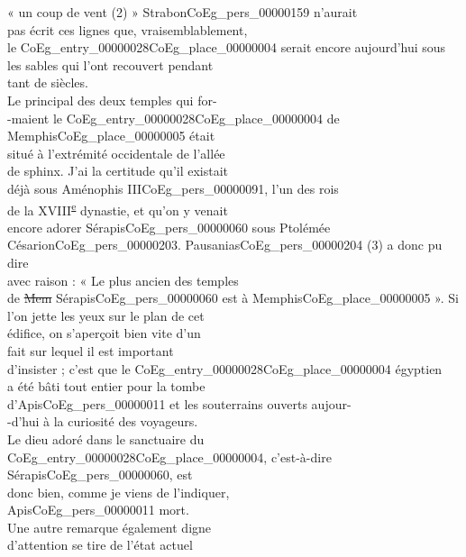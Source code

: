 \documentclass{book}
\begin{document}
{\begin{paracol}{2}
« un coup de vent (2) » Strabon\gls{CoEg_pers_00000159} n’aurait\\
pas écrit ces lignes que, vraisemblablement,\\
le \Gls{CoEg_entry_00000028}\gls{CoEg_place_00000004} serait encore aujourd’hui sous\\
les sables qui l’ont recouvert pendant\\
tant de siècles.\\
\indent Le principal des deux temples qui for-\\
-maient le \Gls{CoEg_entry_00000028}\gls{CoEg_place_00000004} de Memphis\gls{CoEg_place_00000005} était\\
situé à l’extrémité occidentale de l’allée\\
de sphinx. J’ai la certitude qu’il existait\\
déjà sous Aménophis III\gls{CoEg_pers_00000091}, l’un des rois\\
de la XVIII\textsuperscript{\underline{e}} dynastie, et qu’on y venait\\
encore adorer Sérapis\gls{CoEg_pers_00000060} sous Ptolémée\\
Césarion\gls{CoEg_pers_00000203}. Pausanias\gls{CoEg_pers_00000204} (3) a donc pu dire\\
avec raison : « Le plus ancien des temples\\
de \sout{Mem} Sérapis\gls{CoEg_pers_00000060} est à Memphis\gls{CoEg_place_00000005} ». Si\\
l’on jette les yeux sur le plan de cet\\
édifice, on s’aperçoit bien vite d’un\\
fait sur lequel il est important\\
d’insister ; c’est que le \Gls{CoEg_entry_00000028}\gls{CoEg_place_00000004} égyptien\\
a été bâti tout entier pour la tombe\\
d’Apis\gls{CoEg_pers_00000011} et les souterrains ouverts aujour-\\
-d’hui à la curiosité des voyageurs.\\
Le dieu adoré dans le sanctuaire du\\
\Gls{CoEg_entry_00000028}\gls{CoEg_place_00000004}, c’est-à-dire Sérapis\gls{CoEg_pers_00000060}, est\\
donc bien, comme je viens de l’indiquer,\\
Apis\gls{CoEg_pers_00000011} mort.\\
\indent Une autre remarque également digne\\
d’attention se tire de l’état actuel
\end{paracol}

}
\end{document}
